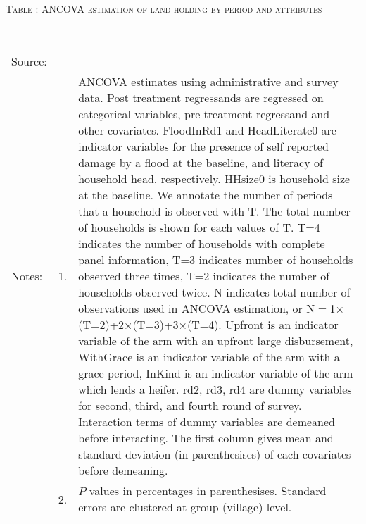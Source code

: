 \hspace{-1cm}\begin{minipage}[t]{14cm}
\hfil\textsc{\normalsize Table \thetable: ANCOVA estimation of land holding by period and attributes\label{tab ANCOVA land period attributes}}\\
\setlength{\tabcolsep}{1pt}
\setlength{\baselineskip}{8pt}
\renewcommand{\arraystretch}{.55}
\hfil{}\\
\renewcommand{\arraystretch}{.8}
\setlength{\tabcolsep}{1pt}
\begin{tabular}{>{\hfill\scriptsize}p{1cm}<{}>{\hfill\scriptsize}p{.25cm}<{}>{\scriptsize}p{12cm}<{\hfill}}
Source:& \multicolumn{2}{l}{\scriptsize Estimated with GUK administrative and survey data.}\\
Notes: & 1. & ANCOVA estimates using administrative and survey data. Post treatment regressands are regressed on categorical variables, pre-treatment regressand and other covariates. \textsf{FloodInRd1} and \textsf{HeadLiterate0} are indicator variables for the presence of self reported damage by a flood at the baseline, and literacy of household head, respectively. \textsf{HHsize0} is household size at the baseline. We annotate the number of periods that a household is observed with \textsf{T}. The total number of households is shown for each values of \textsf{T}. \textsf{T=4} indicates the number of households with complete panel information, \textsf{T=3} indicates number of households observed three times, \textsf{T=2} indicates the number of households observed twice. \textsf{N} indicates total number of observations used in ANCOVA estimation, or \textsf{N$=$1$\times$(T=2)+2$\times$(T=3)+3$\times$(T=4)}.  \textsf{Upfront} is an indicator variable of the arm with an upfront large disbursement, \textsf{WithGrace} is an indicator variable of the arm with a grace period, \textsf{InKind} is an indicator variable of the arm which lends a heifer. \textsf{rd2, rd3, rd4} are dummy variables for second, third, and fourth round of survey. Interaction terms of dummy variables are demeaned before interacting. The first column gives mean and standard deviation (in parenthesises) of each covariates before demeaning.\\
& 2. & $P$ values in percentages in parenthesises. Standard errors are clustered at group (village) level.
\end{tabular}
\end{minipage}

